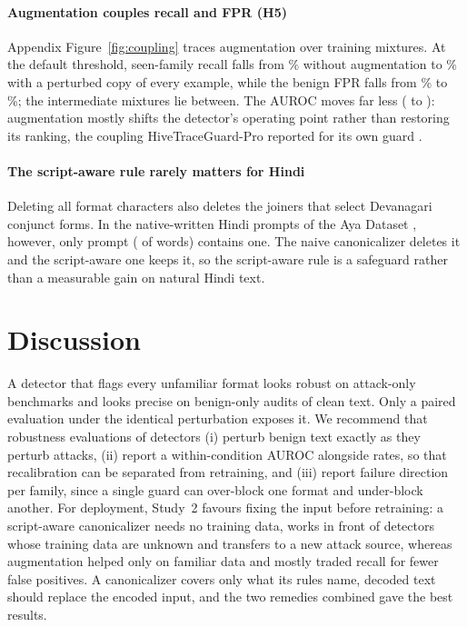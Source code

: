 \documentclass[conference]{IEEEtran}
\begin{document}
\paragraph{Augmentation couples recall and FPR (H5)} Appendix Figure~\ref{fig:coupling} traces augmentation over training mixtures. At the default threshold, seen-family recall falls from \scPidsNoneSeenCharTprDefault\% without augmentation to \scPidsAugmentSeenCharTprDefault\% with a perturbed copy of every example, while the benign FPR falls from \scPidsNoneSeenCharFprDefault\% to \scPidsAugmentSeenCharFprDefault\%; the intermediate mixtures lie between. The AUROC moves far less (\scPidsNoneSeenCharAuc{} to \scPidsAugmentSeenCharAuc{}): augmentation mostly shifts the detector's operating point rather than restoring its ranking, the coupling HiveTraceGuard-Pro reported for its own guard \citep{hivetrace2026}.


\paragraph{The script-aware rule rarely matters for Hindi} Deleting all format characters also deletes the joiners that select Devanagari conjunct forms. In the \ayaTexts{} native-written Hindi prompts of the Aya Dataset \citep{singh2024aya}, however, only \ayaTextsJoiner{} prompt (\ayaWordsJoiner{} of \ayaWords{} words) contains one. The naive canonicalizer deletes it and the script-aware one keeps it, so the script-aware rule is a safeguard rather than a measurable gain on natural Hindi text.

\section{Discussion}

A detector that flags every unfamiliar format looks robust on attack-only benchmarks and looks precise on benign-only audits of clean text. Only a paired evaluation under the identical perturbation exposes it. We recommend that robustness evaluations of detectors (i) perturb benign text exactly as they perturb attacks, (ii) report a within-condition AUROC alongside rates, so that recalibration can be separated from retraining, and (iii) report failure direction per family, since a single guard can over-block one format and under-block another. For deployment, Study~2 favours fixing the input before retraining: a script-aware canonicalizer needs no training data, works in front of detectors whose training data are unknown and transfers to a new attack source, whereas augmentation helped only on familiar data and mostly traded recall for fewer false positives. A canonicalizer covers only what its rules name, decoded text should replace the encoded input, and the two remedies combined gave the best results.
\end{document}
